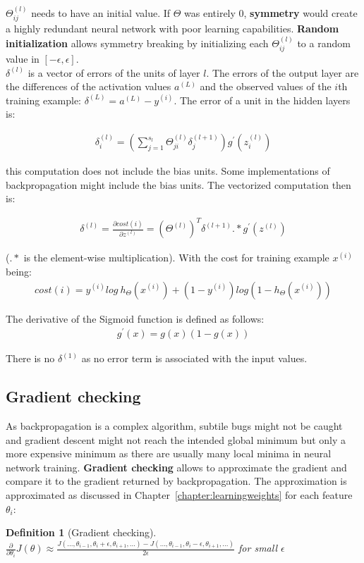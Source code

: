 \documentclass{report}
\newtheorem{definition}{Definition}[section]
\begin{document}
$\Theta_{ij}^{(l)}$ needs to have an initial value. If $\Theta$ was entirely 0, {\bf symmetry} would create a highly redundant neural network with poor learning capabilities.
{\bf Random initialization} allows symmetry breaking by initializing each $\Theta_{ij}^{(l)}$ to a random value in $[-\epsilon,\epsilon]$. \\

$\delta^{(l)}$ is a vector of errors of the units of layer $l$.
The errors of the output layer are the differences of the activation values $a^{(L)}$ and the observed values of the $i$th training example: $\delta^{(L)}=a^{(L)}-y^{(i)}$.
The error of a unit in the hidden layers is: 

\begin{align*}
\delta^{(l)}_i=(\sum_{j=1}^{s_l} \Theta_{ji}^{(l)}\delta_j^{(l+1)})g^{'}(z_i^{(l)})
\end{align*}

this computation does not include the bias units. Some implementations of backpropagation might include the bias units.
The vectorized computation then is:

\begin{align*}
\delta^{(l)} = \frac{\partial cost(i)}{\partial z^{(l)}} =(\Theta^{(l)})^T\delta^{(l+1)}.*g^{'}(z^{(l)})
\end{align*}

($.*$ is the element-wise multiplication). With the cost for training example $x^{(i)}$ being:
\begin{align*}
cost(i) = y^{(i)}log\:h_{\Theta}(x^{(i)})+(1-y^{(i)})log(1-h_{\Theta}(x^{(i)}))
\end{align*}

The derivative of the Sigmoid function is defined as follows:
\begin{align*}
g^{'}(x)=g(x)(1-g(x))
\end{align*}

There is no $\delta^{(1)}$ as no error term is associated with the input values.


\subsection{Gradient checking}
As backpropagation is a complex algorithm, subtile bugs might not be caught and gradient descent might not reach the intended global minimum but only a more expensive minimum as there are usually many local minima in neural network training.
{\bf Gradient checking} allows to approximate the gradient and compare it to the gradient returned by backpropagation.
The approximation is approximated as discussed in Chapter~\ref{chapter:learningweights} for each feature $\theta_i$:
\begin{definition}[Gradient checking] ~\\
$\frac{\partial}{\partial\theta_i}J(\theta)\approx\frac{J(...,\theta_{i-1},\theta_{i}+\epsilon,\theta_{i+1},...)-J(...,\theta_{i-1},\theta_{i}-\epsilon,\theta_{i+1},...)}{2\epsilon}$ for small $\epsilon$
\end{definition}
\end{document}

